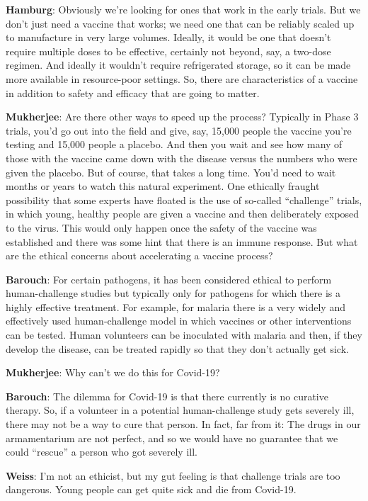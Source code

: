 \textbf{Hamburg}: Obviously we're looking for ones that work in the
early trials. But we don't just need a vaccine that works; we need one
that can be reliably scaled up to manufacture in very large volumes.
Ideally, it would be one that doesn't require multiple doses to be
effective, certainly not beyond, say, a two-dose regimen. And ideally it
wouldn't require refrigerated storage, so it can be made more available
in resource-poor settings. So, there are characteristics of a vaccine in
addition to safety and efficacy that are going to matter.

\textbf{Mukherjee}: Are there other ways to speed up the process?
Typically in Phase 3 trials, you'd go out into the field and give, say,
15,000 people the vaccine you're testing and 15,000 people a placebo.
And then you wait and see how many of those with the vaccine came down
with the disease versus the numbers who were given the placebo. But of
course, that takes a long time. You'd need to wait months or years to
watch this natural experiment. One ethically fraught possibility that
some experts have floated is the use of so-called ``challenge'' trials,
in which young, healthy people are given a vaccine and then deliberately
exposed to the virus. This would only happen once the safety of the
vaccine was established and there was some hint that there is an immune
response. But what are the ethical concerns about accelerating a vaccine
process?

\textbf{Barouch}: For certain pathogens, it has been considered ethical
to perform human-challenge studies but typically only for pathogens for
which there is a highly effective treatment. For example, for malaria
there is a very widely and effectively used human-challenge model in
which vaccines or other interventions can be tested. Human volunteers
can be inoculated with malaria and then, if they develop the disease,
can be treated rapidly so that they don't actually get sick.

\textbf{Mukherjee}: Why can't we do this for Covid-19?

\textbf{Barouch}: The dilemma for Covid-19 is that there currently is no
curative therapy. So, if a volunteer in a potential human-challenge
study gets severely ill, there may not be a way to cure that person. In
fact, far from it: The drugs in our armamentarium are not perfect, and
so we would have no guarantee that we could ``rescue'' a person who got
severely ill.

\textbf{Weiss}: I'm not an ethicist, but my gut feeling is that
challenge trials are too dangerous. Young people can get quite sick and
die from Covid-19.

